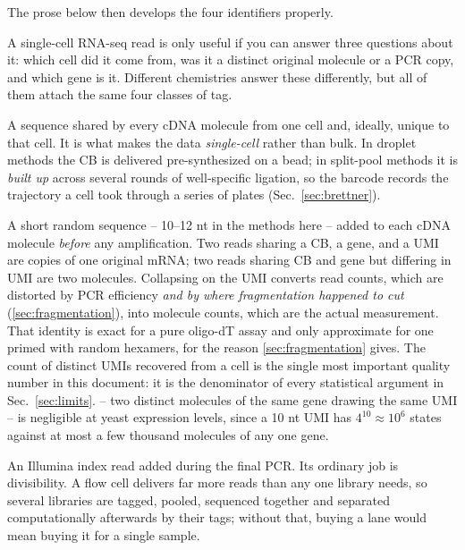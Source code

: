 The prose below then develops the four identifiers properly.

\medskip

\medskip

A single-cell RNA-seq read is only useful if you can answer three questions about
it: which cell did it come from, was it a distinct original molecule or a PCR
copy, and which gene is it. Different chemistries answer these differently, but
all of them attach the same four classes of tag.

 A sequence shared by every cDNA molecule from one
cell and, ideally, unique to that cell. It is what makes the data
\emph{single-cell} rather than bulk. In droplet methods the CB is delivered
pre-synthesized on a bead; in split-pool methods it is \emph{built up} across
several rounds of well-specific ligation, so the barcode records the trajectory
a cell took through a series of plates (Sec.~\ref{sec:brettner}).

 A short random sequence -- 10--12 nt
in the methods here -- added to each cDNA molecule \emph{before} any
amplification. Two reads sharing a CB, a gene, and a UMI are copies of one
original mRNA; two reads sharing CB and gene but differing in UMI are two
molecules. Collapsing on the UMI converts read counts, which are distorted by
PCR efficiency \emph{and by where fragmentation happened to cut}
(\cref{sec:fragmentation}), into molecule counts, which are the actual
measurement. That identity is exact for a pure oligo-dT assay and only
approximate for one primed with random hexamers, for the reason
\cref{sec:fragmentation} gives. The
count of distinct UMIs recovered from a cell is the single most important
quality number in this document: it is the denominator of every statistical
argument in Sec.~\ref{sec:limits}.  -- two distinct
molecules of the same gene drawing the same UMI -- is negligible at yeast
expression levels, since a 10 nt UMI has $4^{10}\approx10^{6}$ states against at
most a few thousand molecules of any one gene.

 An Illumina index read added during the final PCR. Its
ordinary job is divisibility. A flow cell delivers far more reads than any one
library needs, so several libraries are tagged, pooled, sequenced together and
separated computationally afterwards by their tags; without that, buying a lane
would mean buying it for a single sample.

